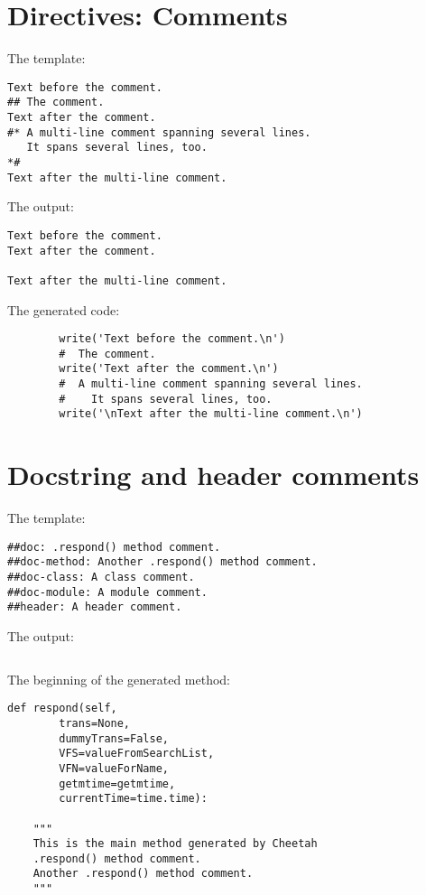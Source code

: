 \section{Directives: Comments}
\label{comments}

The template:

\begin{verbatim}
Text before the comment.
## The comment.
Text after the comment.
#* A multi-line comment spanning several lines.
   It spans several lines, too.
*# 
Text after the multi-line comment.
\end{verbatim}

The output:

\begin{verbatim}
Text before the comment.
Text after the comment.

Text after the multi-line comment.

\end{verbatim}

The generated code:

\begin{verbatim}
        write('Text before the comment.\n')
        #  The comment.
        write('Text after the comment.\n')
        #  A multi-line comment spanning several lines.
        #    It spans several lines, too.
        write('\nText after the multi-line comment.\n')
\end{verbatim}

\section{Docstring and header comments}
\label{comments.docstring}

The template:
\begin{verbatim}
##doc: .respond() method comment.
##doc-method: Another .respond() method comment.
##doc-class: A class comment.
##doc-module: A module comment.
##header: A header comment.
\end{verbatim}

The output:
\begin{verbatim}

\end{verbatim}

The beginning of the generated  method:
\begin{verbatim}
def respond(self,
        trans=None,
        dummyTrans=False,
        VFS=valueFromSearchList,
        VFN=valueForName,
        getmtime=getmtime,
        currentTime=time.time):

    """
    This is the main method generated by Cheetah
    .respond() method comment.
    Another .respond() method comment.
    """
\end{verbatim}

